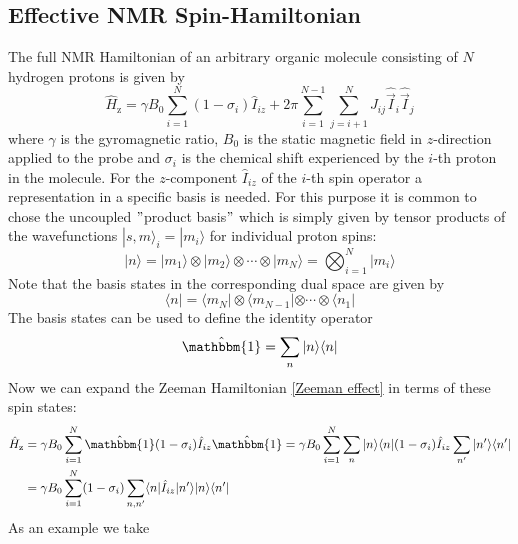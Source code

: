 \documentclass[9pt]{report}
\begin{document}
\subsection{Effective NMR Spin-Hamiltonian}
The full NMR Hamiltonian of an arbitrary organic molecule consisting of $N$ hydrogen protons is given by
\begin{equation}
\hat{H}_{\mathrm{z}} = \gamma B_0\sum_{i=1}^{N}(1-\sigma_i)\hat{I}_{iz} +2\pi\sum_{i=1}^{N-1}\sum_{j=i+1}^{N}J_{ij}\hat{\vec{I}}_{i}\hat{\vec{I}}_{j}\label{Zeeman effect}
\end{equation}
where $\gamma$ is the gyromagnetic ratio, $B_0$ is the static magnetic field in $z$-direction applied to the probe and $\sigma_i$ is the chemical shift experienced by the $i$-th proton in the molecule. For the $z$-component $\hat{I}_{iz}$ of the $i$-th spin operator a representation in a specific basis is needed. For this purpose it is common to chose the uncoupled $"$product basis$"$ which is simply given by tensor products of the wavefunctions $|s,m\rangle_i =|m_i\rangle$ for individual proton spins:
\begin{equation}
|n\rangle = |m_1\rangle\otimes|m_2\rangle\otimes\cdots\otimes|m_N\rangle = \bigotimes_{i=1}^{N}|m_i\rangle
\end{equation}
Note that the basis states in the corresponding dual space are given by
\begin{equation}
\langle n| = \langle m_N|\otimes\langle m_{N-1}|\otimes\cdots\otimes\langle n_1|
\end{equation}
The basis states can be used to define the identity operator
\begin{equation}
\hat{\mathbbm{1}}=\sum_{n}|n\rangle\langle n|
\end{equation}
Now we can expand the Zeeman Hamiltonian \eqref{Zeeman effect} in terms of these spin states:
\begin{align}
\hat{H}_{\mathrm{z}} &= \gamma B_0\sum_{i=1}^{N}\hat{\mathbbm{1}}(1-\sigma_i)\hat{I}_{iz}\hat{\mathbbm{1}} = \gamma B_0\sum_{i=1}^{N}\sum_{n}|n\rangle\langle n|(1-\sigma_i)\hat{I}_{iz}\sum_{n'}|n'\rangle\langle n'|\\
&= \gamma B_0\sum_{i=1}^{N}(1-\sigma_i)\sum_{n,n'}\langle n|\hat{I}_{iz}|n'\rangle|n\rangle\langle n'|
\end{align}
As an example we take 
\end{document}
